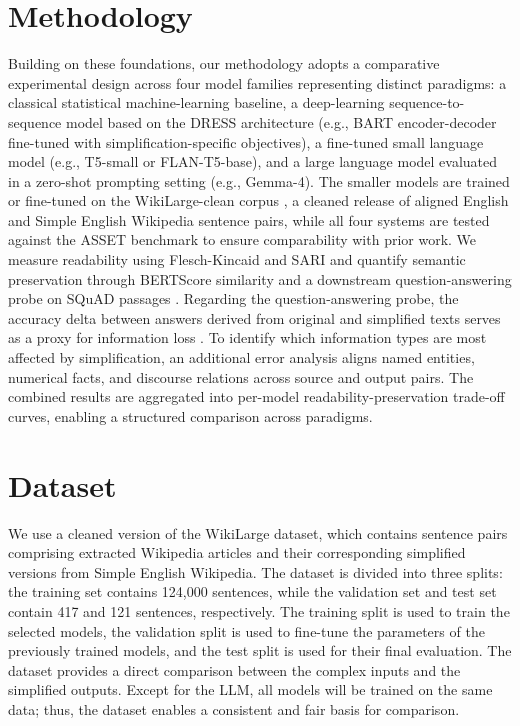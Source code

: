 \documentclass[11pt,a4paper]{article}
\begin{document}
\section*{Methodology}
Building on these foundations, our methodology adopts a comparative experimental design across four model families representing distinct paradigms: a classical statistical machine-learning baseline, a deep-learning sequence-to-sequence model based on the DRESS architecture (e.g., BART encoder-decoder fine-tuned with simplification-specific objectives), a fine-tuned small language model (e.g., T5-small or FLAN-T5-base), and a large language model evaluated in a zero-shot prompting setting (e.g., Gemma-4). The smaller models are trained or fine-tuned on the WikiLarge-clean corpus \cite{simplifythis2025}, a cleaned release of aligned English and Simple English Wikipedia sentence pairs, while all four systems are tested against the ASSET benchmark to ensure comparability with prior work. We measure readability using Flesch-Kincaid and SARI and quantify semantic preservation through BERTScore similarity and a downstream question-answering probe on SQuAD passages \cite{Zhang*2020BERTScore:, rajpurkar-etal-2016-squad}. Regarding the question-answering probe, the accuracy delta between answers derived from original and simplified texts serves as a proxy for information loss \cite{deutsch-etal-2021-towards}. To identify which information types are most affected by simplification, an additional error analysis aligns named entities, numerical facts, and discourse relations across source and output pairs. The combined results are aggregated into per-model readability-preservation trade-off curves, enabling a structured comparison across paradigms.

\section*{Dataset}
We use a cleaned version of the WikiLarge dataset, which contains sentence pairs comprising extracted Wikipedia articles  and their corresponding simplified versions from Simple English Wikipedia. The dataset is divided into three splits: the training set contains 124,000 sentences, while the validation set and test set contain  417 and 121 sentences, respectively. The training split is used to train the selected models, the validation split is used to fine-tune the parameters of the previously trained models, and the test split is used for their final evaluation. The dataset provides a direct comparison between the complex inputs and the simplified outputs. Except for the LLM, all models will be trained on the same data; thus, the dataset enables a consistent and fair basis for comparison.
\end{document}
